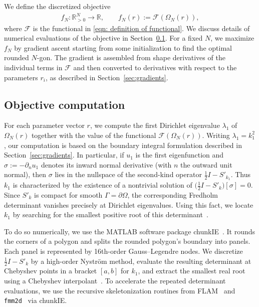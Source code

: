 \documentclass{amsart}
\theoremstyle{plain}
\begin{document}
We define the discretized objective
  \begin{align}
    f_N:\mathbb{R}_{>0}^N\to\mathbb{R},\quad\quad f_N(r):=\mathcal{F}(\Omega_N(r)),
  \end{align}
where $\mathcal{F}$ is the functional in \eqref{eqn: definition of functional}.
We discuss details of numerical evaluations of the objective in Section~\ref{sec:objective}.
For a fixed $N$, we maximize $f_N$ by gradient ascent starting from some initialization to find the optimal rounded $N$-gon.
The gradient is assembled from shape derivatives of the individual terms in $\mathcal{F}$ and then converted to derivatives with respect to the parameters $r_i$, as described in Section~\ref{sec:gradients}.

\subsection{Objective computation}\label{sec:objective}
For each parameter vector $r$, we compute the first Dirichlet eigenvalue $\lambda_1$ of $\Omega_N(r)$ together with the value of the functional $\mathcal{F}(\Omega_N(r))$.
Writing $\lambda_1=k_1^2$, our computation is based on the boundary integral formulation described in Section~\ref{sec:gradients}.
In particular, if $u_1$ is the first eigenfunction and $\sigma:=-\partial_n u_1$ denotes its inward normal derivative (with $n$ the outward unit normal), then $\sigma$ lies in the nullspace of the second-kind operator $\frac{1}{2} I-S'_{k_1}$.
Thus $k_1$ is characterized by the existence of a nontrivial solution of $\big(\frac{1}{2} I-S'_k\big)[\sigma]=0$.
Since $S'_k$ is compact for smooth $\Gamma=\partial\Omega$, the corresponding Fredholm determinant vanishes precisely at Dirichlet eigenvalues.
Using this fact, we locate $k_1$ by searching for the smallest positive root of this determinant~\cite{zhao2015robust,bornemann2010numerical}.

To do so numerically, we use the MATLAB software package chunkIE~\cite{chunkIE}.
It rounds the corners of a polygon and splits the rounded polygon's boundary into panels.
Each panel is represented by 16th-order Gauss--Legendre nodes.
We discretize $\frac{1}{2} I-S'_k$ by a high-order Nystr\"om method, evaluate the resulting determinant at Chebyshev points in a bracket $[a,b]$ for $k_1$, and extract the smallest real root using a Chebyshev interpolant~\cite{platte2010chebfun}.
To accelerate the repeated determinant evaluations, we use the recursive skeletonization routines from FLAM~\cite{ho2020flam} and \texttt{fmm2d}~\cite{greengard1987fast} via chunkIE.
\end{document}
